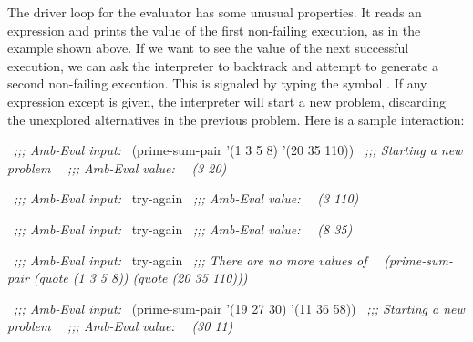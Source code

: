 The driver loop for the  evaluator has some unusual properties.  It
reads an expression and prints the value of the first non-failing execution, as
in the  example shown above.  If we want to see the value
of the next successful execution, we can ask the interpreter to backtrack and
attempt to generate a second non-failing execution.  This is signaled by typing
the symbol .  If any expression except  is
given, the interpreter will start a new problem, discarding the unexplored
alternatives in the previous problem.  Here is a sample interaction:

\begin{codeBlock}
~\textit{;;; Amb-Eval input:}~
(prime-sum-pair '(1 3 5 8) '(20 35 110))
~\textit{;;; Starting a new problem}~
~\textit{;;; Amb-Eval value:}~
~\textit{(3 20)}~

~\textit{;;; Amb-Eval input:}~
try-again
~\textit{;;; Amb-Eval value:}~
~\textit{(3 110)}~

~\textit{;;; Amb-Eval input:}~
try-again
~\textit{;;; Amb-Eval value:}~
~\textit{(8 35)}~

~\textit{;;; Amb-Eval input:}~
try-again
~\textit{;;; There are no more values of}~
~\textit{(prime-sum-pair (quote (1 3 5 8)) (quote (20 35 110)))}~

~\textit{;;; Amb-Eval input:}~
(prime-sum-pair '(19 27 30) '(11 36 58))
~\textit{;;; Starting a new problem}~
~\textit{;;; Amb-Eval value:}~
~\textit{(30 11)}~
\end{codeBlock}


